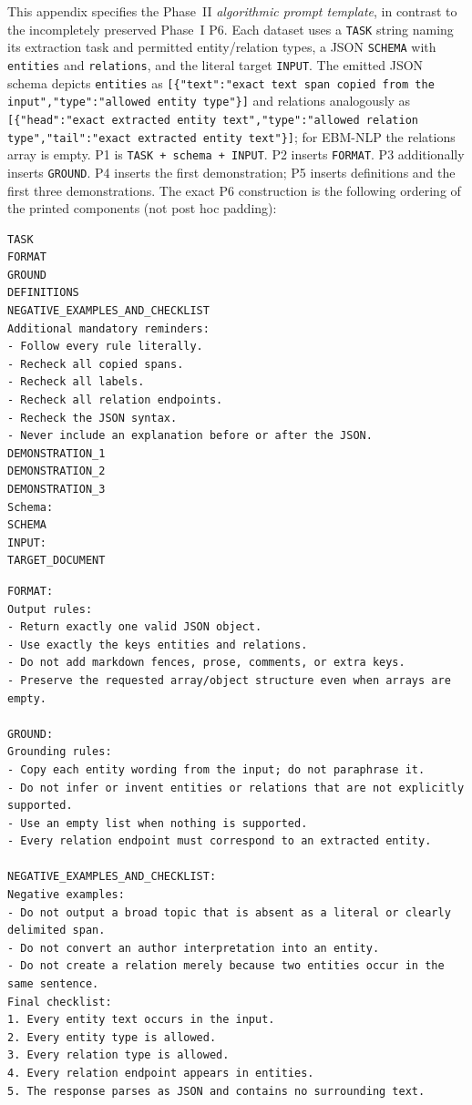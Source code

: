\documentclass[fleqn,10pt]{wlscirep-authoryear}
\begin{document}
This appendix specifies the Phase~II \emph{algorithmic prompt template}, in
contrast to the incompletely preserved Phase~I P6. Each dataset uses a
\texttt{TASK} string naming its extraction task and permitted entity/relation
types, a JSON \texttt{SCHEMA} with \texttt{entities} and \texttt{relations},
and the literal target \texttt{INPUT}. The emitted JSON schema depicts
\texttt{entities} as \texttt{[\{"text":"exact text span copied from the
input","type":"allowed entity type"\}]} and relations analogously as
\texttt{[\{"head":"exact extracted entity text","type":"allowed
relation type","tail":"exact extracted entity text"\}]}; for EBM-NLP the
relations array is empty. P1 is \texttt{TASK + schema + INPUT}. P2 inserts
\texttt{FORMAT}. P3 additionally inserts \texttt{GROUND}. P4 inserts the
first demonstration; P5 inserts definitions and the first three
demonstrations. The exact P6 construction is the following ordering of the
printed components (not post hoc padding):

\begin{lstlisting}[style=promptstyle]
TASK
FORMAT
GROUND
DEFINITIONS
NEGATIVE_EXAMPLES_AND_CHECKLIST
Additional mandatory reminders:
- Follow every rule literally.
- Recheck all copied spans.
- Recheck all labels.
- Recheck all relation endpoints.
- Recheck the JSON syntax.
- Never include an explanation before or after the JSON.
DEMONSTRATION_1
DEMONSTRATION_2
DEMONSTRATION_3
Schema:
SCHEMA
INPUT:
TARGET_DOCUMENT
\end{lstlisting}

\begin{lstlisting}[style=promptstyle]
FORMAT:
Output rules:
- Return exactly one valid JSON object.
- Use exactly the keys entities and relations.
- Do not add markdown fences, prose, comments, or extra keys.
- Preserve the requested array/object structure even when arrays are empty.

GROUND:
Grounding rules:
- Copy each entity wording from the input; do not paraphrase it.
- Do not infer or invent entities or relations that are not explicitly supported.
- Use an empty list when nothing is supported.
- Every relation endpoint must correspond to an extracted entity.

NEGATIVE_EXAMPLES_AND_CHECKLIST:
Negative examples:
- Do not output a broad topic that is absent as a literal or clearly delimited span.
- Do not convert an author interpretation into an entity.
- Do not create a relation merely because two entities occur in the same sentence.
Final checklist:
1. Every entity text occurs in the input.
2. Every entity type is allowed.
3. Every relation type is allowed.
4. Every relation endpoint appears in entities.
5. The response parses as JSON and contains no surrounding text.
\end{lstlisting}
\end{document}
